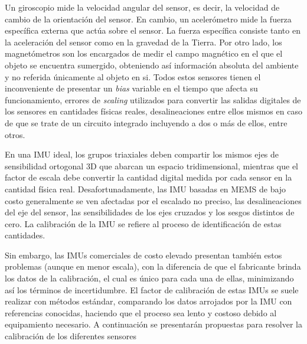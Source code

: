 Un giroscopio mide la velocidad angular del sensor, es decir, la velocidad de cambio de la orientación del sensor. En cambio, un acelerómetro mide la fuerza específica externa que actúa sobre el sensor. La fuerza específica consiste tanto en la aceleración del sensor como en la gravedad de la Tierra. Por otro lado, los magnetómetros son los encargados de medir el campo magnético en el que el objeto se encuentra sumergido, obteniendo así información absoluta del ambiente y no referida únicamente al objeto en si. Todos estos sensores tienen el inconveniente de presentar un \textit{bias} variable en el tiempo que afecta su funcionamiento, errores de \textit{scaling} utilizados para convertir las salidas digitales de los sensores en cantidades físicas reales, desalineaciones entre ellos mismos en caso de que se trate de un circuito integrado incluyendo a dos o más de ellos, entre otros.

En una IMU ideal, los grupos triaxiales deben compartir los mismos ejes de sensibilidad ortogonal 3D que abarcan un espacio tridimensional, mientras que el factor de escala debe convertir la cantidad digital medida por cada sensor en la cantidad física real. Desafortunadamente, las IMU basadas en MEMS de bajo costo generalmente se ven afectadas por el escalado no preciso, las desalineaciones del eje del sensor, las sensibilidades de los ejes cruzados y los sesgos distintos de cero. La calibración de la IMU se refiere al proceso de identificación de estas cantidades.

Sin embargo, las IMUs comerciales de costo elevado presentan también estos problemas (aunque en menor escala), con la diferencia de que el fabricante brinda los datos de la calibración, el cual es único para cada una de ellas, minimizando así los términos de incertidumbre. El factor de calibración de estas IMUs se suele realizar con métodos estándar, comparando los datos arrojados por la IMU con referencias conocidas, haciendo que el proceso sea lento y costoso debido al equipamiento necesario. A continuación se presentarán propuestas para resolver la calibración de los diferentes sensores

